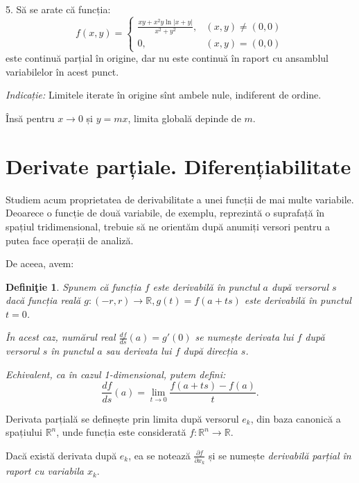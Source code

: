 \documentclass[11pt,a4paper]{article}
\newcommand\RR{\mathbb{R}}
\theoremstyle{dotless}
\theoremstyle{dotlessdr}
\newtheorem{definition}{Defini\c{t}ie}[section]
\begin{document}
\vspace{1cm}

5. Să se arate că funcția:
\[
  f(x, y) = \begin{cases}
    \frac{xy + x^2 y \ln |x + y|}{x^2 + y^2}, & (x, y) \neq (0, 0) \\
    0, & (x, y) = (0, 0)
  \end{cases}
\]
este continuă parțial în origine, dar nu este continuă în raport cu ansamblul variabilelor în acest punct.

\emph{Indicație:} Limitele iterate în origine sînt ambele nule, indiferent de ordine.

Însă pentru $x \to 0$ și $y = mx$, limita globală depinde de $m$.


\section{Derivate parțiale. Diferențiabilitate}
\label{sec:der-part}

Studiem acum proprietatea de derivabilitate a unei funcții de mai multe variabile. Deoarece
o funcție de două variabile, de exemplu, reprezintă o suprafață în spațiul tridimensional,
trebuie să ne orientăm după anumiți versori pentru a putea face operații de analiză.

De aceea, avem:

\begin{definition}\label{def:der-vers}
  Spunem că funcția $f$ este \emph{derivabilă în punctul $a$ după versorul $s$} dacă funcția
  reală $g : (-r, r) \to \RR, g(t) = f(a + ts)$ este derivabilă în punctul $t = 0$.

  În acest caz, numărul real $\frac{df}{ds}(a) = g'(0)$ se numește \emph{derivata lui $f$ %
    după versorul $s$ în punctul $a$} sau \emph{derivata lui $f$ după direcția $s$}.

  Echivalent, ca în cazul 1-dimensional, putem defini:
  \[
    \frac{df}{ds}(a) = \lim_{t \to 0} \frac{f(a + ts) - f(a)}{t}.
  \]
\end{definition}

Derivata parțială se definește prin limita după versorul $e_k$, din baza canonică
a spațiului $\RR^n$, unde funcția este considerată $f : \RR^n \to \RR$.

Dacă există derivata după $e_k$, ea se notează $\frac{\partial f}{\partial x_k}$
și se numește \emph{derivabilă parțial în raport cu variabila $x_k$}.
\end{document}
